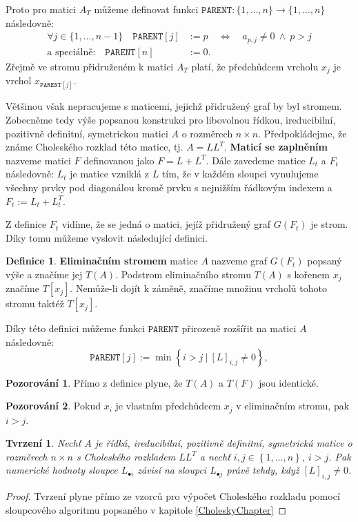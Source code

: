\documentclass[11pt,american,czech,oneside]{book}
\theoremstyle{plain}
\newtheorem{proposition}{Tvrzení}
\theoremstyle{definition}
\newtheorem{definition}{Definice}
\newtheorem{observation}{Pozorování}
\begin{document}
Proto pro matici $A_T$ můžeme definovat funkci $\texttt{PARENT}:\{1,\ldots,n\} \rightarrow \{1,\ldots,n\}$ následovně:
\begin{align*}
  \forall j \in \{1,\ldots,n-1\} \quad \texttt{PARENT}[j] & := p \quad \Leftrightarrow \quad a_{p,j} \neq 0 \ \wedge \ p > j \\
  \text{a speciálně:} \quad \texttt{PARENT}[n] & := 0.
\end{align*}
Zřejmě ve stromu přidruženém k matici $A_T$ platí, že předchůdcem vrcholu $x_j$ je vrchol $x_{\texttt{PARENT}[j]}$.

Většinou však nepracujeme s maticemi, jejichž přidružený graf by byl stromem. Zobecněme tedy výše popsanou konstrukci pro libovolnou řídkou, ireducibilní, pozitivně definitní, symetrickou matici $A$ o rozměrech $n \times n$. Předpokládejme, že známe Choleského rozklad této matice, tj. $A = LL^T$. \textbf{Maticí se zaplněním} nazveme matici $F$ definovanou jako $F = L + L^T$. Dále zavedeme matice $L_t$ a $F_t$ následovně: $L_t$ je matice vzniklá z $L$ tím, že v každém sloupci vynulujeme všechny prvky pod diagonálou kromě prvku s nejnižším řádkovým indexem a $F_t := L_t + L_t^T$.

Z definice $F_t$ vidíme, že se jedná o matici, jejíž přidružený graf $G(F_t)$ je strom. Díky tomu můžeme vyslovit následující definici.

\begin{definition}
    \textbf{Eliminačním stromem} matice $A$ nazveme graf $G(F_t)$ popsaný výše a značíme jej $T(A)$.
    Podstrom eliminačního stromu $T(A)$ s kořenem $x_j$ značíme $T[x_j]$. Nemůže-li dojít k záměně, značíme množinu vrcholů tohoto stromu taktéž $T[x_j]$.
\end{definition}

Díky této definici můžeme funkci $\texttt{PARENT}$ přirozeně rozšířit na matici $A$ následovně:
\[
    \texttt{PARENT}[j] := \min \left\{ i > j \ | \ [L]_{i,j} \neq 0\right\},
\]

\begin{observation}
Přímo z definice plyne, že $T(A)$ a $T(F)$ jsou identické.
\end{observation}

\begin{observation}
Pokud $x_i$ je vlastním předchůdcem $x_j$ v eliminačním stromu, pak $i > j$.
\end{observation}

\begin{proposition}
  \label{ColDepProposition}
  Nechť $A$ je řídká, ireducibilní, pozitivně definitní, symetrická matice o rozměrech $n \times n$ s Choleského rozkladem $LL^T$ a nechť $i,j \in \left\{1,\ldots,n \right\}$, $i > j$. Pak numerické hodnoty sloupce $L_{\bullet i}$ závisí na sloupci $L_{\bullet j}$ právě tehdy,
  když $[L]_{i,j} \neq 0$.
\end{proposition}
\begin{proof}
  Tvrzení plyne přímo ze vzorců pro výpočet Choleského rozkladu pomocí sloupcového algoritmu popsaného v kapitole \ref{CholeskyChapter}
\end{proof}
\end{document}
